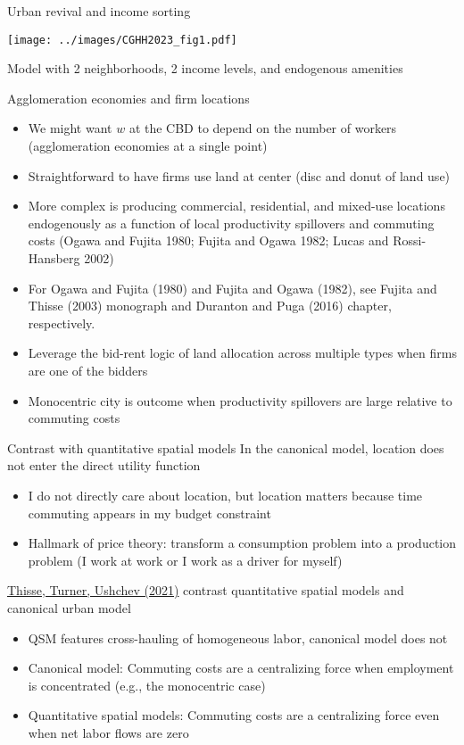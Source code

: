 \documentclass[11pt,notes=hide,aspectratio=169]{beamer}
\begin{document}
\begin{frame}{Urban revival and income sorting}
\begin{center}
\texttt{[image: ../images/CGHH2023\_fig1.pdf]}
\end{center}
\vspace{-4mm}
{\footnotesize Model with 2 neighborhoods, 2 income levels, and endogenous amenities}
\end{frame}
\begin{frame}{Agglomeration economies and firm locations}
\begin{itemize}
\item
We might want $w$ at the CBD to depend on the number of workers (agglomeration economies at a single point)
\item
Straightforward to have firms use land at center (disc and donut of land use)
\item
More complex is producing commercial, residential, and mixed-use locations endogenously 
as a function of local productivity spillovers and commuting costs
(Ogawa and Fujita 1980; Fujita and Ogawa 1982; Lucas and Rossi-Hansberg 2002)
\item
For Ogawa and Fujita (1980) and Fujita and Ogawa (1982),
see Fujita and Thisse (2003) monograph and Duranton and Puga (2016) chapter, respectively.
\item Leverage the bid-rent logic of land allocation across multiple types when firms are one of the bidders
\item Monocentric city is outcome when productivity spillovers are large relative to commuting costs
\end{itemize}
\end{frame}
\begin{frame}{Contrast with quantitative spatial models}
In the canonical model, location does not enter the direct utility function
\begin{itemize}
\item I do not directly care about location, but location matters because time commuting appears in my budget constraint
\item Hallmark of price theory:
transform a consumption problem into a production problem (I work at work or I work as a driver for myself)
\end{itemize}
\href{https://matthewturner.org/papers/unpublished/Thisse_Turner_Ushchev_unp_2021.pdf}{Thisse, Turner, Ushchev (2021)}
contrast quantitative spatial models and canonical urban model
\begin{itemize}
\item QSM features cross-hauling of homogeneous labor, canonical model does not
\item Canonical model: Commuting costs are a centralizing force when employment is concentrated (e.g., the monocentric case)
\item Quantitative spatial models: Commuting costs are a centralizing force even when net labor flows are zero
\end{itemize}
\end{frame}
\end{document}
